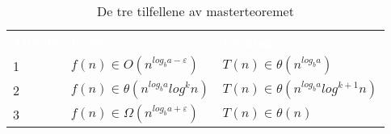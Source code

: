 \begin{table}[H]
    \caption{De tre tilfellene av masterteoremet}
    \label{tab:masterteoremet}
    \centering
    \begin{tabular}{|L{5em} | L{18em}|L{18em}|}
        \hline
        \textbf{\textcolor{white}{Tilfelle}} & \textbf{\textcolor{white}{Krav}} & \textbf{\textcolor{white}{Løsning}}\\
        1 & $f(n) \in O(n^{log_b a-\varepsilon})$ & $T(n) \in \theta(n^{log_b a})$ \\
        2 & $f(n) \in \theta(n^{log_b a} log^k n)$ & $T(n) \in \theta(n^{log_b a} log^{k + 1}n)$ \\
        3 & $f(n) \in \Omega(n^{log_b a+\varepsilon})$ & $T(n) \in \theta(n)$ \\
         \hline
    \end{tabular}
\end{table}
